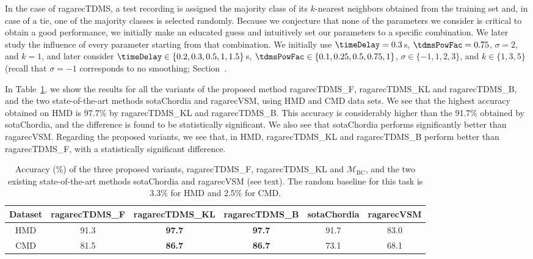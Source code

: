 In the case of \acrshort{ragarecTDMS}, a test recording is assigned the majority class of its $k$-nearest neighbors obtained from the training set and, in case of a tie, one of the majority classes is selected randomly. Because we conjecture that none of the parameters we consider is critical to obtain a good performance, we initially make an educated guess and intuitively set our parameters to a specific combination. We later study the influence of every parameter starting from that combination. We initially use $\timeDelay=0.3$\,s, $\tdmsPowFac=0.75$, $\sigma=2$, and $k=1$, and later consider $\timeDelay\in\lbrace 0.2, 0.3, 0.5, 1, 1.5\rbrace$\,s, $\tdmsPowFac\in\lbrace 0.1, 0.25, 0.5, 0.75, 1 \rbrace$, $\sigma\in\lbrace -1, 1, 2, 3\rbrace$, and $k\in\lbrace 1,3,5\rbrace$ (recall that $\sigma=-1$ corresponds to no smoothing; Section~.


In Table~\ref{tab:main_results}, we show the results for all the variants of the proposed method \acrshort{ragarecTDMS_F}, \acrshort{ragarecTDMS_KL} and \acrshort{ragarecTDMS_B}, and the two state-of-the-art methods \acrshort{sotaChordia} and \acrshort{ragarecVSM}, using HMD and CMD data sets. We see that the highest accuracy obtained on HMD is 97.7\% by \acrshort{ragarecTDMS_KL} and \acrshort{ragarecTDMS_B}. This accuracy is considerably higher than the 91.7\% obtained by \acrshort{sotaChordia}, and the difference is found to be statistically significant. We also see that \acrshort{sotaChordia} performs significantly better than \acrshort{ragarecVSM}. Regarding the proposed variants, we see that, in HMD, \acrshort{ragarecTDMS_KL} and \acrshort{ragarecTDMS_B} perform better than \acrshort{ragarecTDMS_F}, with a statistically significant difference. 

\begin{table}[t] 
	\centering
	{
		\begin{tabular}{ c | c c c | c c}
			\hline\hline
			Dataset   	& 	\acrshort{ragarecTDMS_F} 	&	\acrshort{ragarecTDMS_KL}		&	\acrshort{ragarecTDMS_B}	&	\acrshort{sotaChordia}		&	\acrshort{ragarecVSM}\\	
			\hline
			HMD   	& 	91.3 	&	{\bf 97.7}		&	{\bf 97.7} 	&	91.7		&	83.0\\	
			
			CMD   	& 	81.5	&	{\bf 86.7}		&	{\bf 86.7}	&	73.1		&	68.1\\	
			\hline\hline
		\end{tabular}
	}
	\caption{Accuracy (\%) of the three proposed variants, \acrshort{ragarecTDMS_F}, \acrshort{ragarecTDMS_KL} and $\mathcal{M}_{\mathrm{BC}}$, and the two existing state-of-the-art methods \acrshort{sotaChordia} and \acrshort{ragarecVSM} (see text). The random baseline for this task is 3.3\% for HMD and 2.5\% for CMD. }
	\label{tab:main_results}
\end{table}

